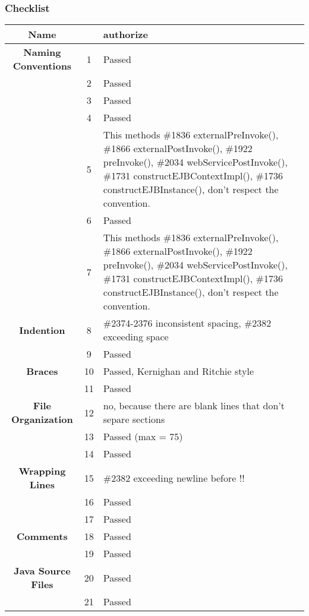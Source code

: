 \documentclass[11pt, a4paper,titlepage]{article}
\begin{document}
\subsubsection{Checklist}
 \begin{tabularx}{\textwidth}{| c |c |X |}
 	\hline \textbf{Name} & & authorize \\
 	\hline \textbf{Naming Conventions} & 1  & Passed  \\
 	\hline  & 2 & Passed\\
 	\hline  & 3 & Passed \\
 	\hline  & 4 & Passed \\
 	\hline  & 5 & This methods \#1836 externalPreInvoke(), \#1866 externalPostInvoke(), \#1922 preInvoke(), \#2034 webServicePostInvoke(), \#1731 \textunderscore constructEJBContextImpl(), \#1736 \textunderscore constructEJBInstance(), don't respect the convention. \\
 	\hline  & 6 & Passed \\
 	\hline  & 7 & This methods \#1836 externalPreInvoke(), \#1866 externalPostInvoke(), \#1922 preInvoke(), \#2034 webServicePostInvoke(), \#1731 \textunderscore constructEJBContextImpl(), \#1736 \textunderscore constructEJBInstance(), don't respect the convention. \\
 	\hline \textbf{Indention} & 8 & \#2374-2376 inconsistent spacing, \#2382 exceeding space
 	\\
 	\hline  & 9 & Passed \\
 	\hline \textbf{Braces} & 10 & Passed, Kernighan and Ritchie style
 	\\
 	\hline  & 11 & Passed \\
 	\hline \textbf{File Organization} & 12 & no, because there are blank lines that don't separe sections
 	\\
 	\hline  & 13 & Passed (max = 75) \\
 	\hline  & 14 & Passed \\
 	\hline \textbf{Wrapping Lines} & 15 & \#2382 exceeding newline before !!
 	\\
 	\hline  & 16 & Passed \\
 	\hline  & 17 & Passed \\
 	\hline \textbf{Comments} & 18 & Passed \\
 	\hline  & 19 & Passed \\
 	\hline \textbf{Java Source Files} & 20 & Passed \\
 	\hline  & 21 & Passed \\
 	\hline
 \end{tabularx}
\end{document}
